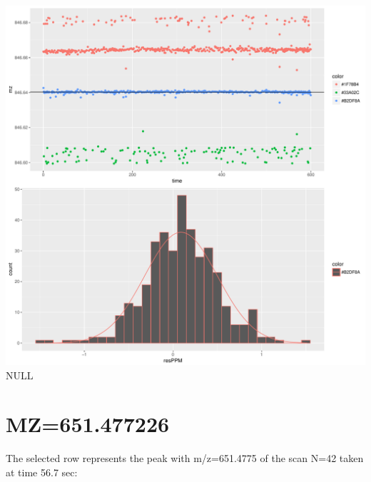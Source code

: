 \documentclass[]{article}
\newenvironment{Shaded}{\begin{snugshade}}{\end{snugshade}}
\newcommand{\KeywordTok}[1]{\textcolor[rgb]{0.13,0.29,0.53}{\textbf{#1}}}
\newcommand{\FloatTok}[1]{\textcolor[rgb]{0.00,0.00,0.81}{#1}}
\newcommand{\OperatorTok}[1]{\textcolor[rgb]{0.81,0.36,0.00}{\textbf{#1}}}
\newcommand{\NormalTok}[1]{#1}
\begin{document}
\includegraphics{Supplementary_document_files/figure-latex/filter.lm.846-1.pdf}
NULL

\section{MZ=651.477226}\label{mz651.477226}

\begin{Shaded}
\end{Shaded}

The selected row represents the peak with m/z=651.4775 of the scan N=42
taken at time 56.7 sec:

\begin{Shaded}
\end{Shaded}
\end{document}

